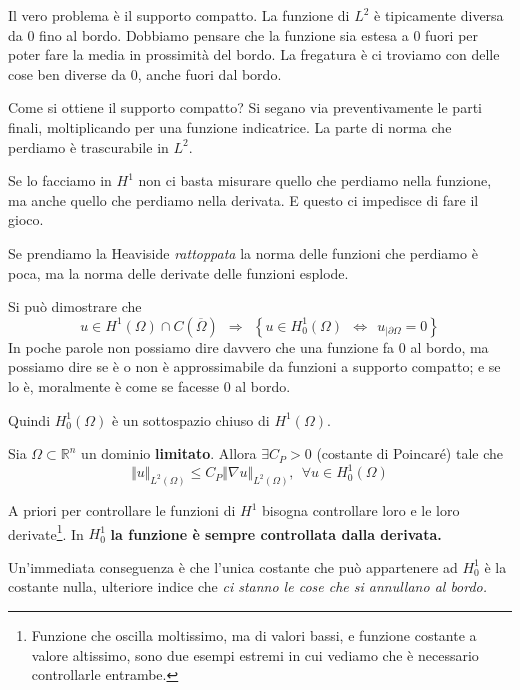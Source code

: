 \documentclass[10pt,a4paper,twoside,openright]{book}
\begin{document}
Il vero problema è il supporto compatto. La funzione di $L^{2}$ è tipicamente diversa da $0$ fino al bordo. Dobbiamo pensare che la funzione sia estesa a $0$ fuori per poter fare la media in prossimità del bordo. La fregatura è ci troviamo con delle cose ben diverse da $0$, anche fuori dal bordo.

Come si ottiene il supporto compatto? Si segano via preventivamente le parti finali, moltiplicando per una funzione indicatrice. La parte di norma che perdiamo è trascurabile in $L^{2}$.

Se lo facciamo in $H^{1}$ non ci basta misurare quello che perdiamo nella funzione, ma anche quello che perdiamo nella derivata. E questo ci impedisce di fare il gioco.

Se prendiamo la Heaviside \textit{rattoppata} la norma delle funzioni che perdiamo è poca, ma la norma delle derivate delle funzioni esplode.



Si può dimostrare che
\begin{equation*}
	u\in H^{1}( \Omega ) \cap C(\overline{\Omega }) \ \ \Rightarrow \ \ \left\{u\in H^{1}_{0}( \Omega ) \ \ \Leftrightarrow \ \ u_{|\partial \Omega } =0\right\}
\end{equation*}
In poche parole non possiamo dire davvero che una funzione fa $0$ al bordo, ma possiamo dire se è o non è approssimabile da funzioni a supporto compatto; e se lo è, moralmente è come se facesse $0$ al bordo.

Quindi $H^{1}_{0}( \Omega )$ è un sottospazio chiuso di $H^{1}( \Omega )$.
\begin{theorem}
	 Sia $\Omega \subset \mathbb{R}^{n}$ un dominio \textbf{limitato}. Allora $\exists C_{P}  >0$ (costante di Poincaré) tale che
	\begin{equation*}
		\Vert u\Vert _{L^{2}( \Omega )} \leqslant C_{P}\Vert \nabla u\Vert _{L^{2}( \Omega )} ,\ \ \forall u\in H^{1}_{0}( \Omega )
	\end{equation*}
\end{theorem}
A priori per controllare le funzioni di $H^{1}$ bisogna controllare loro e le loro derivate\footnote{Funzione che oscilla moltissimo, ma di valori bassi, e funzione costante a valore altissimo, sono due esempi estremi in cui vediamo che è necessario controllarle entrambe.}. In $H^{1}_{0}$ \textbf{la funzione è sempre controllata dalla derivata.}
\begin{oss}
	Un'immediata conseguenza è che l'unica costante che può appartenere ad $H^{1}_{0}$ è la costante nulla, ulteriore indice che \textit{ci stanno le cose che si annullano al bordo.}
\end{oss}
\end{document}
